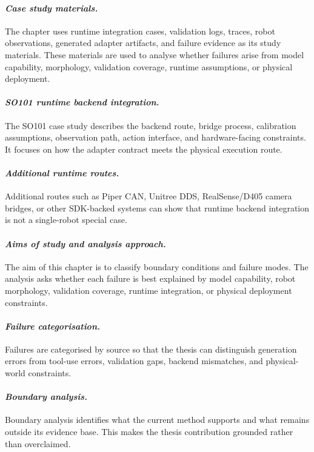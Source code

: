 \paragraph{\textit{Case study materials.}}
The chapter uses runtime integration cases, validation logs, traces, robot
observations, generated adapter artifacts, and failure evidence as its study
materials. These materials are used to analyse whether failures arise from
model capability, morphology, validation coverage, runtime assumptions, or
physical deployment.

\paragraph{\textit{SO101 runtime backend integration.}}
The SO101 case study describes the backend route, bridge process, calibration
assumptions, observation path, action interface, and hardware-facing
constraints. It focuses on how the adapter contract meets the physical
execution route.

\paragraph{\textit{Additional runtime routes.}}
Additional routes such as Piper CAN, Unitree DDS, RealSense/D405 camera
bridges, or other SDK-backed systems can show that runtime backend integration
is not a single-robot special case.

\paragraph{\textit{Aims of study and analysis approach.}}
The aim of this chapter is to classify boundary conditions and failure modes.
The analysis asks whether each failure is best explained by model capability,
robot morphology, validation coverage, runtime integration, or physical
deployment constraints.

\paragraph{\textit{Failure categorisation.}}
Failures are categorised by source so that the thesis can distinguish
generation errors from tool-use errors, validation gaps, backend mismatches,
and physical-world constraints.

\paragraph{\textit{Boundary analysis.}}
Boundary analysis identifies what the current method supports and what remains
outside its evidence base. This makes the thesis contribution grounded rather
than overclaimed.

